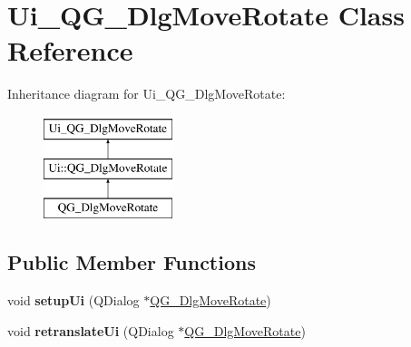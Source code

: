\hypertarget{classUi__QG__DlgMoveRotate}{\section{Ui\-\_\-\-Q\-G\-\_\-\-Dlg\-Move\-Rotate Class Reference}
\label{classUi__QG__DlgMoveRotate}
}
Inheritance diagram for Ui\-\_\-\-Q\-G\-\_\-\-Dlg\-Move\-Rotate\-:\begin{figure}[H]
\begin{center}
\leavevmode
\includegraphics[height=3.000000cm]{classUi__QG__DlgMoveRotate}
\end{center}
\end{figure}
\subsection*{Public Member Functions}
\begin{DoxyCompactItemize}
\item 
\hypertarget{classUi__QG__DlgMoveRotate_afddeff670ccbcf939a6e24c65efb15d9}{void {\bfseries setup\-Ui} (Q\-Dialog $\ast$\hyperlink{classQG__DlgMoveRotate}{Q\-G\-\_\-\-Dlg\-Move\-Rotate})}\label{classUi__QG__DlgMoveRotate_afddeff670ccbcf939a6e24c65efb15d9}

\item 
\hypertarget{classUi__QG__DlgMoveRotate_a07666895e2eedc7baba04c5a4dee64c9}{void {\bfseries retranslate\-Ui} (Q\-Dialog $\ast$\hyperlink{classQG__DlgMoveRotate}{Q\-G\-\_\-\-Dlg\-Move\-Rotate})}\label{classUi__QG__DlgMoveRotate_a07666895e2eedc7baba04c5a4dee64c9}

\end{DoxyCompactItemize}
